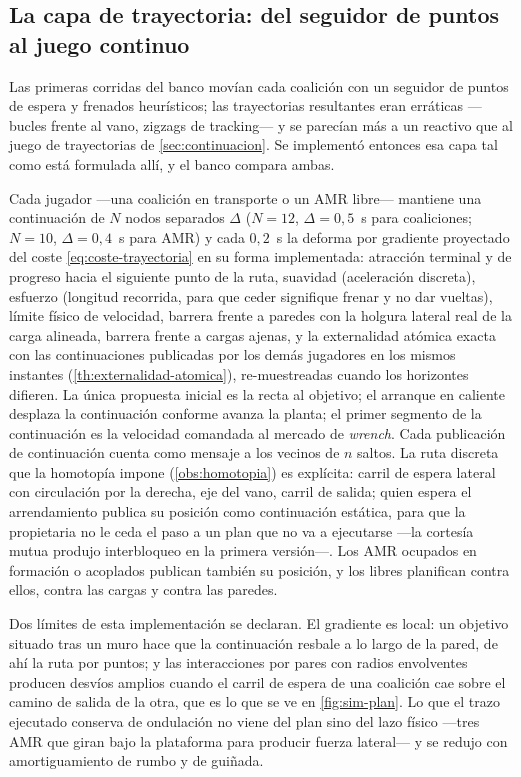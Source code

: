 \subsection{La capa de trayectoria: del seguidor de puntos al juego continuo}

Las primeras corridas del banco movían cada coalición con un seguidor de
puntos de espera y frenados heurísticos; las trayectorias resultantes eran
erráticas —bucles frente al vano, zigzags de tracking— y se parecían más a un
reactivo que al juego de trayectorias de \cref{sec:continuacion}. Se
implementó entonces esa capa tal como está formulada allí, y el banco compara
ambas.

Cada jugador —una coalición en transporte o un AMR libre— mantiene una
continuación de $N$ nodos separados $\Delta$ ($N=12$, $\Delta=0{,}5$~s para
coaliciones; $N=10$, $\Delta=0{,}4$~s para AMR) y cada $0{,}2$~s la deforma
por gradiente proyectado del coste \eqref{eq:coste-trayectoria} en su forma
implementada: atracción terminal y de progreso hacia el siguiente punto de la
ruta, suavidad (aceleración discreta), esfuerzo (longitud recorrida, para que
ceder signifique frenar y no dar vueltas), límite físico de velocidad, barrera
frente a paredes con la holgura lateral real de la carga alineada, barrera
frente a cargas ajenas, y la externalidad atómica exacta con las
continuaciones publicadas por los demás jugadores en los mismos instantes
(\cref{th:externalidad-atomica}), re-muestreadas cuando los horizontes
difieren. La única propuesta inicial es la recta al objetivo; el arranque en
caliente desplaza la continuación conforme avanza la planta; el primer
segmento de la continuación es la velocidad comandada al mercado de
\emph{wrench}. Cada publicación de continuación cuenta como mensaje a los
vecinos de $n$ saltos. La ruta discreta que la homotopía impone
(\cref{obs:homotopia}) es explícita: carril de espera lateral con circulación
por la derecha, eje del vano, carril de salida; quien espera el arrendamiento
publica su posición como continuación estática, para que la propietaria no le
ceda el paso a un plan que no va a ejecutarse —la cortesía mutua produjo
interbloqueo en la primera versión—. Los AMR ocupados en formación o acoplados
publican también su posición, y los libres planifican contra ellos, contra las
cargas y contra las paredes.

Dos límites de esta implementación se declaran. El gradiente es local: un
objetivo situado tras un muro hace que la continuación resbale a lo largo de
la pared, de ahí la ruta por puntos; y las interacciones por pares con radios
envolventes producen desvíos amplios cuando el carril de espera de una
coalición cae sobre el camino de salida de la otra, que es lo que se ve en
\cref{fig:sim-plan}. Lo que el trazo ejecutado conserva de ondulación no viene
del plan sino del lazo físico —tres AMR que giran bajo la plataforma para
producir fuerza lateral— y se redujo con amortiguamiento de rumbo y de guiñada.

